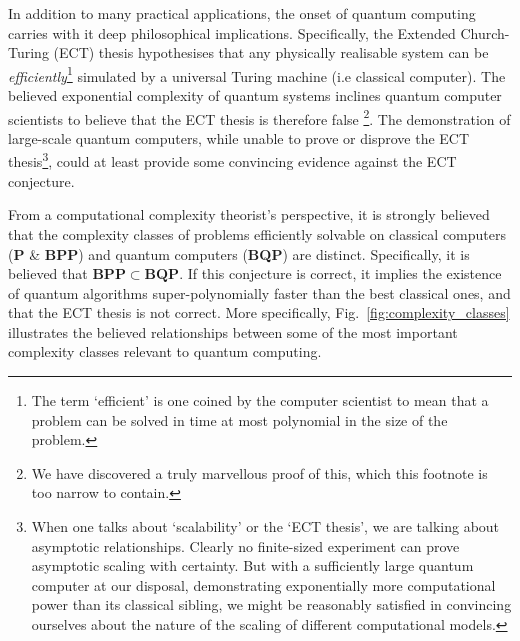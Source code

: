 In addition to many practical applications, the onset of quantum computing carries with it deep philosophical implications. Specifically, the Extended Church-Turing (ECT) thesis hypothesises that any physically realisable system can be \textit{efficiently}\footnote{The term `efficient' is one coined by the computer scientist to mean that a problem can be solved in time at most polynomial in the size of the problem.} simulated by a universal Turing machine (i.e classical computer). The believed exponential complexity of quantum systems inclines quantum computer scientists to believe that the ECT thesis is therefore false \cite{bib:Deutsch85}\footnote{We have discovered a truly marvellous proof of this, which this footnote is too narrow to contain.}. The demonstration of large-scale quantum computers, while unable to prove or disprove the ECT thesis\footnote{When one talks about `scalability' or the `ECT thesis', we are talking about asymptotic relationships. Clearly no finite-sized experiment can prove asymptotic scaling with certainty. But with a sufficiently large quantum computer at our disposal, demonstrating exponentially more computational power than its classical sibling, we might be reasonably satisfied in convincing ourselves about the nature of the scaling of different computational models.}, could at least provide some convincing evidence against the ECT conjecture.

From a computational complexity theorist's perspective, it is strongly believed that the complexity classes of problems efficiently solvable on classical computers (\textbf{P} \& \textbf{BPP}) and quantum computers (\textbf{BQP}) are distinct. Specifically, it is believed that \mbox{$\mathbf{BPP}\subset\mathbf{BQP}$}. If this conjecture is correct, it implies the existence of quantum algorithms super-polynomially faster than the best classical ones, and that the ECT thesis is not correct. More specifically, Fig.~\ref{fig:complexity_classes} illustrates the believed relationships between some of the most important complexity classes relevant to quantum computing.

